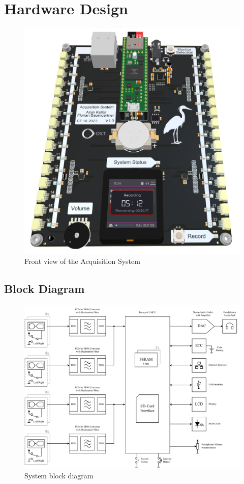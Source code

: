 \newpage
\section{Hardware Design}

\begin{figure}[h]
	\centering
	\includegraphics[width=1.0\textwidth]{images/4_design_acquisition_system/Acquisition_System_Front.png}
	\caption{Front view of the Acquisition System}
	\label{fig:acquisition_system_front}
\end{figure}


\subsection{Block Diagram}

\begin{figure}[h]
	\centering
	\includegraphics[width=1.0\textwidth]{images/4_design_acquisition_system/system_block_diagram.pdf}
	\caption{System block diagram}
	\label{fig:system_block_diagram}
\end{figure}

